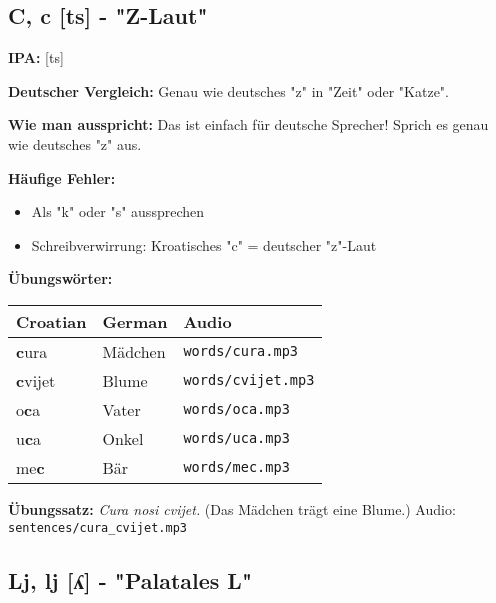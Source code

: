 \subsection{C, c [ts] - "Z-Laut"}

\begin{tcolorbox}[colback=lightyellow!30, colframe=orange, title=\textbf{C, c}]

\textbf{IPA:} [ts]

\textbf{Deutscher Vergleich:}
Genau wie deutsches "z" in "Zeit" oder "Katze".

\textbf{Wie man ausspricht:}
Das ist einfach für deutsche Sprecher! Sprich es genau wie deutsches "z" aus.

\textbf{Häufige Fehler:}
\begin{itemize}
    \item Als "k" oder "s" aussprechen
    \item Schreibverwirrung: Kroatisches "c" = deutscher "z"-Laut
\end{itemize}

\textbf{Übungswörter:}
\begin{tabular}{lll}
\textbf{Croatian} & \textbf{German} & \textbf{Audio} \\
\midrule
\textbf{c}ura & Mädchen & \texttt{words/cura.mp3} \\
\textbf{c}vijet & Blume & \texttt{words/cvijet.mp3} \\
o\textbf{c}a & Vater & \texttt{words/oca.mp3} \\
u\textbf{c}a & Onkel & \texttt{words/uca.mp3} \\
me\textbf{c} & Bär & \texttt{words/mec.mp3} \\
\end{tabular}

\textbf{Übungssatz:}
\textit{Cura nosi cvijet.}
(Das Mädchen trägt eine Blume.)
Audio: \texttt{sentences/cura\_cvijet.mp3}

\end{tcolorbox}

\subsection{Lj, lj [ʎ] - "Palatales L"}


